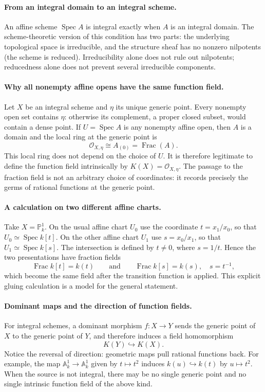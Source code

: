 \paragraph{From an integral domain to an integral scheme.}
An affine scheme \(\operatorname{Spec}A\) is integral exactly when \(A\)
is an integral domain.  The scheme-theoretic version of this condition
has two parts: the underlying topological space is irreducible, and the
structure sheaf has no nonzero nilpotents (the scheme is reduced).
Irreducibility alone does not rule out nilpotents; reducedness alone
does not prevent several irreducible components.

\paragraph{Why all nonempty affine opens have the same function field.}
Let \(X\) be an integral scheme and \(\eta\) its unique generic point.
Every nonempty open set contains \(\eta\): otherwise its complement,
a proper closed subset, would contain a dense point.
If \(U=\operatorname{Spec}A\) is any nonempty affine open, then
\(A\) is a domain and the local ring at the generic point is
\[
 \mathcal O_{X,\eta}\cong A_{(0)}=\operatorname{Frac}(A).
\]
This local ring does not depend on the choice of \(U\).
It is therefore legitimate to define the function field intrinsically by
\(K(X)=\mathcal O_{X,\eta}\).  The passage to the fraction field is not
an arbitrary choice of coordinates: it records precisely the germs of
rational functions at the generic point.

\paragraph{A calculation on two different affine charts.}
Take \(X=\mathbb P^1_k\).
On the usual affine chart \(U_0\) use the coordinate \(t=x_1/x_0\),
so that \(U_0\simeq\operatorname{Spec}k[t]\).
On the other affine chart \(U_1\) use \(s=x_0/x_1\),
so that \(U_1\simeq\operatorname{Spec}k[s]\).
The intersection is defined by \(t\neq 0\), where \(s=1/t\).
Hence the two presentations have fraction fields
\[
 \operatorname{Frac}k[t]=k(t)
 \qquad\text{and}\qquad
 \operatorname{Frac}k[s]=k(s),\quad s=t^{-1},
\]
which become the same field after the transition function is applied.
This explicit gluing calculation is a model for the general statement.

\paragraph{Dominant maps and the direction of function fields.}
For integral schemes, a dominant morphism \(f:X\to Y\) sends the generic
point of \(X\) to the generic point of \(Y\), and therefore induces a
field homomorphism
\[
 K(Y)\hookrightarrow K(X).
\]
Notice the reversal of direction: geometric maps pull rational
functions back.  For example, the map
\(\mathbb A^1_k\to\mathbb A^1_k\) given by \(t\mapsto t^2\)
induces \(k(u)\hookrightarrow k(t)\) by \(u\mapsto t^2\).
When the source is not integral, there may be no single generic point
and no single intrinsic function field of the above kind.
